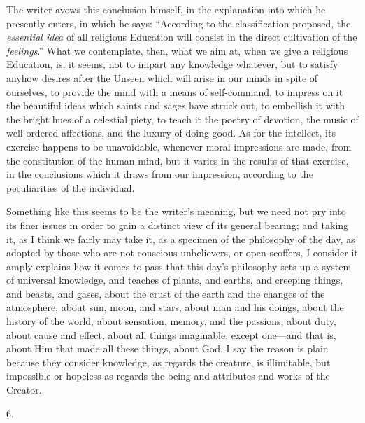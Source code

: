 The writer avows this conclusion himself, in the explanation into
which he presently enters, in which he says: ``According to the
classification proposed, the \emph{essential idea} of all religious
Education will consist in the direct cultivation of the \emph{feelings}.''
What we contemplate, then, what we aim at, when we give a religious
Education, is, it seems, not to impart any knowledge whatever, but to
satisfy anyhow desires after the Unseen which will arise in our minds
in spite of ourselves, to provide the mind with a means of
self-command, to impress on it the beautiful ideas which saints and
sages have struck out, to embellish it with the bright hues of a
celestial piety, to teach it the poetry of devotion, the music of
well-ordered affections, and the luxury of doing good. As for the
intellect, its exercise happens to be unavoidable, whenever moral
impressions are made, from the constitution of the human mind, but it
varies in the results of that exercise, in the conclusions which it
draws from our impression, according to the peculiarities of the
individual.

Something like this seems to be the writer's meaning, but we need
not pry into its finer issues in order to gain a distinct view of
its general bearing; and taking it, as I think we fairly may take it,
as a specimen of the philosophy of the day, as adopted by those who
are not conscious unbelievers, or open scoffers, I consider it amply
explains how it comes to pass that this day's philosophy sets up a
system of universal knowledge, and teaches of plants, and earths, and
creeping things, and beasts, and gases, about the crust of the earth
and the changes of the atmosphere, about sun, moon, and stars, about
man and his doings, about the history of the world, about sensation,
memory, and the passions, about duty, about cause and effect, about
all things imaginable, except one—and that is, about Him that made
all these things, about God. I say the reason is plain because they
consider knowledge, as regards the creature, is illimitable, but
impossible or hopeless as regards the being and attributes and works
of the Creator.

6.

